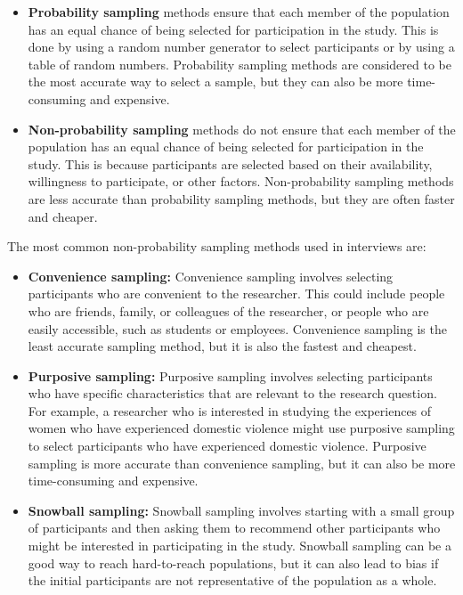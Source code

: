 \documentclass[
  b5paper]{book}
\begin{document}
\begin{itemize}
\item
  \textbf{Probability sampling} methods ensure that each member of the population has an equal chance of being selected for participation in the study. This is done by using a random number generator to select participants or by using a table of random numbers. Probability sampling methods are considered to be the most accurate way to select a sample, but they can also be more time-consuming and expensive.
\item
  \textbf{Non-probability sampling} methods do not ensure that each member of the population has an equal chance of being selected for participation in the study. This is because participants are selected based on their availability, willingness to participate, or other factors. Non-probability sampling methods are less accurate than probability sampling methods, but they are often faster and cheaper.
\end{itemize}

The most common non-probability sampling methods used in interviews are:

\begin{itemize}
\item
  \textbf{Convenience sampling:} Convenience sampling involves selecting participants who are convenient to the researcher. This could include people who are friends, family, or colleagues of the researcher, or people who are easily accessible, such as students or employees. Convenience sampling is the least accurate sampling method, but it is also the fastest and cheapest.
\item
  \textbf{Purposive sampling:} Purposive sampling involves selecting participants who have specific characteristics that are relevant to the research question. For example, a researcher who is interested in studying the experiences of women who have experienced domestic violence might use purposive sampling to select participants who have experienced domestic violence. Purposive sampling is more accurate than convenience sampling, but it can also be more time-consuming and expensive.
\item
  \textbf{Snowball sampling:} Snowball sampling involves starting with a small group of participants and then asking them to recommend other participants who might be interested in participating in the study. Snowball sampling can be a good way to reach hard-to-reach populations, but it can also lead to bias if the initial participants are not representative of the population as a whole.
\end{itemize}
\end{document}
